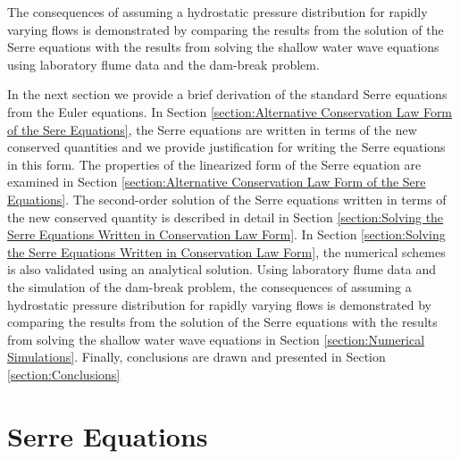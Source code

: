 \documentclass[SingleSpace,12pt]{Serre_ASCE}
\begin{document}
The consequences of assuming a hydrostatic pressure distribution for rapidly varying flows is demonstrated by comparing the results from the solution of the Serre equations with the results from solving the shallow water wave equations using laboratory flume data and the dam-break problem.

In the next section we provide a brief derivation of the standard Serre equations from the Euler equations. In Section \ref{section:Alternative Conservation Law Form of the Sere Equations}, the Serre equations are written in terms of the new conserved quantities and we provide justification for writing the Serre equations in this form. The properties of the linearized form of the Serre equation are examined in Section \ref{section:Alternative Conservation Law Form of the Sere Equations}. The second-order solution of the Serre equations written in terms of the new conserved quantity is described in detail in Section \ref{section:Solving the Serre Equations Written in Conservation Law Form}. In Section \ref{section:Solving the Serre Equations Written in Conservation Law Form}, the numerical schemes is also validated using an analytical solution. Using laboratory flume data and the simulation of the dam-break problem, the consequences of assuming a hydrostatic pressure distribution for rapidly varying flows is demonstrated by comparing the results from the solution of the Serre equations with the results from solving the shallow water wave equations in Section \ref{section:Numerical Simulations}. Finally, conclusions are drawn and presented in Section \ref{section:Conclusions}

\section{Serre Equations}
\label{section:Serre Equations}
\end{document}
